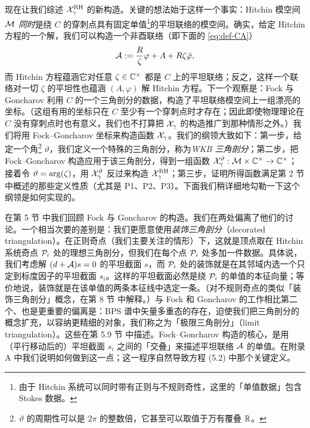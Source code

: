 现在让我们综述 $\mathcal{X}^{\rm RH}_{\gamma}$ 的新构造。关键的想法始于这样一个事实：Hitchin 模空间 $\mathcal{M}$ \emph{同时}是绕 $C$ 的穿刺点具有固定单值\footnote{由于 Hitchin 系统可以同时带有正则与不规则奇性，这里的「单值数据」包含 Stokes 数据。}的平坦联络的模空间。确实，给定 Hitchin 方程的一个解，我们可以构造一个非酉联络（即下面的 \eqref{eq:def-CA}）
\begin{equation}
\mathcal{A} : = \frac{R}{\zeta} \varphi + A + R \zeta \bar \varphi, \label{eq:def-CA}
\end{equation}
而 Hitchin 方程蕴涵它对任意 $\zeta \in \mathbb{C}^\times$ 都是 $C$ 上的平坦联络；反之，这样一个联络对一切 $\zeta$ 的平坦性也蕴涵 $(A,\varphi)$ 解 Hitchin 方程。下一个观察是：Fock 与 Goncharov 利用 $C$ 的一个三角剖分的数据，构造了平坦联络模空间上一组漂亮的坐标\cite{MR2233852}。（这组有用的坐标只在 $C$ 至少有一个穿刺点时才存在；因此即使物理理论在 $C$ 没有穿刺点时也有意义，我们也不打算把 $\mathcal{X}_\gamma$ 的构造推广到那种情形之外。）我们将用 Fock–Goncharov 坐标来构造函数 $\mathcal{X}_{\gamma}$。我们的纲领大致如下：第一步，给定一个角\footnote{$\vartheta$ 的周期性可以是 $2\pi$ 的整数倍，它甚至可以取值于万有覆叠 $\mathbb{R}$。} $\vartheta$，我们定义一个特殊的三角剖分，称为\emph{WKB 三角剖分}；第二步，把 Fock–Goncharov 构造应用于该三角剖分，得到一组函数 $\mathcal{X}_{\gamma}^{\vartheta}: \mathcal{M} \times \mathbb{C}^\times \to \mathbb{C}^\times$；接着令 $\vartheta = {\rm arg}(\zeta)$，用 $\mathcal{X}_{\gamma}^{\vartheta}$ 反过来构造 $\mathcal{X}^{\rm RH}_{\gamma}$；第三步，证明所得函数满足第 2 节中概述的那些定义性质（尤其是 P1、P2、P3）。下面我们稍详细地勾勒一下这个纲领是如何实现的。

在第 5 节%
中我们回顾 Fock 与 Goncharov 的构造\cite{MR2233852}。我们在两处偏离了他们的讨论。一个相当次要的差别是：我们更愿意使用\emph{装饰三角剖分}（decorated triangulation）。在正则奇点（我们主要关注的情形）下，这就是顶点取在 Hitchin 系统奇点 $\mathcal{P}_i$ 处的理想三角剖分，但我们在每个点 $\mathcal{P}_i$ 处多加一件数据。具体说，我们考虑解 $(d+\mathcal{A})s=0$ 的平坦截面 $s$，而 $\mathcal{P}_i$ 处的装饰就是在其邻域内选一个只定到标度因子的平坦截面 $s_i$。这样的平坦截面必然是绕 $\mathcal{P}_i$ 的单值的本征向量；等价地说，装饰就是在该单值的两条本征线中选定一条。（对不规则奇点的类似「装饰三角剖分」概念，在第 8 节%
中解释。）与 Fock 和 Goncharov 的工作相比第二个、也是更重要的偏离是：BPS 谱中矢量多重态的存在，迫使我们把三角剖分的概念扩充，以容纳更精细的对象，我们称之为「极限三角剖分」（limit triangulation）。这些在第 5.9 节%
中描述。Fock–Goncharov 构造的核心，是用（平行移动后的）平坦截面 $s_i$ 之间的「交叠」来描述平坦联络 $\mathcal{A}$ 的单值。在附录 A%
中我们说明如何做到这一点；这一程序自然导致方程 (5.2) 中那个关键定义。%

